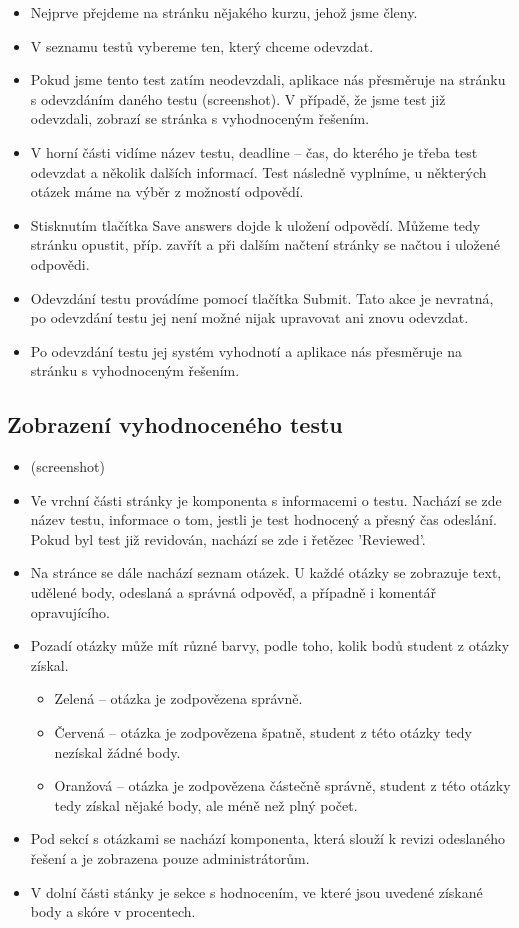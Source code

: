 \begin{itemize}
	\item Nejprve přejdeme na stránku nějakého kurzu, jehož jsme členy.
	\item V seznamu testů vybereme ten, který chceme odevzdat.
	\item Pokud jsme tento test zatím neodevzdali, aplikace nás přesměruje na stránku s odevzdáním daného testu (screenshot). V případě, že jsme test již odevzdali, zobrazí se stránka s vyhodnoceným řešením.
	\item V horní části vidíme název testu, deadline -- čas, do kterého je třeba test odevzdat a několik dalších informací. Test následně vyplníme, u některých otázek máme na výběr z možností odpovědí.
	\item Stisknutím tlačítka Save answers dojde k uložení odpovědí. Můžeme tedy stránku opustit, příp. zavřít a při dalším načtení stránky se načtou i uložené odpovědi.
	\item Odevzdání testu provádíme pomocí tlačítka Submit. Tato akce je nevratná, po odevzdání testu jej není možné nijak upravovat ani znovu odevzdat.
	\item Po odevzdání testu jej systém vyhodnotí a aplikace nás přesměruje na stránku s vyhodnoceným řešením.
\end{itemize}

\subsection{Zobrazení vyhodnoceného testu}

\begin{itemize}
	\item (screenshot)
	\item Ve vrchní části stránky je komponenta s informacemi o testu. Nachází se zde název testu, informace o tom, jestli je test hodnocený a přesný čas odeslání. Pokud byl test již revidován, nachází se zde i řetězec 'Reviewed'. 
	\item Na stránce se dále nachází seznam otázek. U každé otázky se zobrazuje text, udělené body, odeslaná a správná odpověď, a případně i komentář opravujícího.
	\item Pozadí otázky může mít různé barvy, podle toho, kolik bodů student z otázky získal.
		\begin{itemize}
			\item Zelená -- otázka je zodpovězena správně.
			\item Červená -- otázka je zodpovězena špatně, student z této otázky tedy nezískal žádné body.
			\item Oranžová -- otázka je zodpovězena částečně správně, student z této otázky tedy získal nějaké body, ale méně než plný počet.
		\end{itemize}
	\item Pod sekcí s otázkami se nachází komponenta, která slouží k revizi odeslaného řešení a je zobrazena pouze administrátorům.
	\item V dolní části stánky je sekce s hodnocením, ve které jsou uvedené získané body a skóre v procentech.
\end{itemize}


